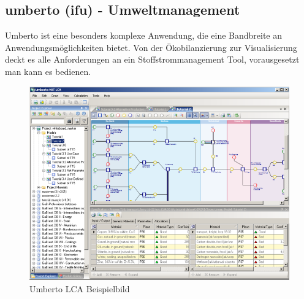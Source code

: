 \documentclass[a4paper, 12pt, twoside, BCOR=20mm, DIV=calc, abstracton, parskip=half*, toc=bibliography, toc=listof, headsepline, footsepline, headings=small, numbers=enddot]{scrreprt}
\begin{document}
%
%
\subsection{umberto (ifu) - Umweltmanagement}
Umberto ist eine besonders komplexe Anwendung, die eine Bandbreite an Anwendungsmöglichkeiten bietet. Von der Ökobilanzierung zur Visualisierung deckt es alle Anforderungen an ein Stoffstrommanagement Tool, vorausgesetzt man kann es bedienen. 

\begin{figure}
\includegraphics[width=\textwidth]{Bild/Umberto NXT LCA.png}
\caption{Umberto LCA Beispielbild} 
 \end{figure}
\end{document}
